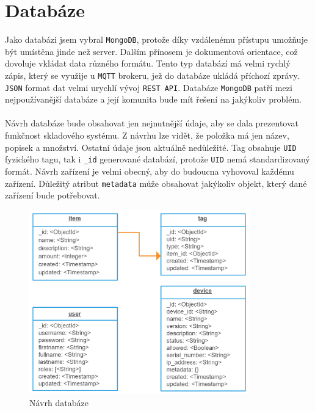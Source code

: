 \documentclass[czech,BP]{thesiskiv}
\begin{document}
				
		
		
		
	\section{Databáze}
		Jako databázi jsem vybral \texttt{MongoDB}, protože díky vzdálenému přístupu umožňuje být umístěna jinde než server.
		Dalším přínosem je dokumentová orientace, což dovoluje vkládat data různého formátu. Tento typ databází má velmi rychlý zápis, který
		se využije u \texttt{MQTT} brokeru, jež do databáze ukládá příchozí zprávy. \texttt{JSON} format dat velmi urychlí vývoj \texttt{REST API}.  
		Databáze \texttt{MongoDB} patří mezi nejpoužívanější databáze a její komunita bude mít řešení na jakýkoliv problém.
	\\\\
		Návrh databáze bude obsahovat jen nejnutnější údaje, aby se dala prezentovat funkčnost skladového systému.
		Z návrhu lze vidět, že položka má jen název, popisek a množství. Ostatní údaje jsou aktuálně nedůležité. 
		Tag obsahuje \texttt{UID} fyzického tagu, tak i \texttt{\_id} generované databází, protože \texttt{UID} nemá standardizovaný formát.
		Návrh zařízení je velmi obecný, aby do budoucna vyhovoval každému zařízení. 
		Důležitý atribut \texttt{metadata} může obsahovat jakýkoliv objekt, který dané zařízení bude potřebovat.

	\begin{figure}[H]
		\centering
		\includegraphics[width=0.85\textwidth]{../diagrams/warehouse_db_diagram.png}	
		\caption{Návrh databáze}
		\label{fig:data}
	\end{figure}
	
\end{document}
